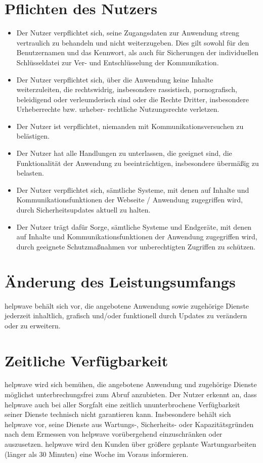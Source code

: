 \documentclass[10pt]{article}
\begin{document}
\section{Pflichten des Nutzers}
\begin{itemize}
	\item Der Nutzer verpflichtet sich, seine Zugangsdaten zur Anwendung streng vertraulich zu behandeln und nicht weiterzugeben.
	      Dies gilt sowohl für den Benutzernamen und das Kennwort, als auch für Sicherungen der individuellen Schlüsseldatei zur
	      Ver- und Entschlüsselung der Kommunikation.
	\item Der Nutzer verpflichtet sich, über die Anwendung keine Inhalte weiterzuleiten, die rechtswidrig, insbesondere rassistisch,
	      pornografisch, beleidigend oder verleumderisch sind oder die Rechte Dritter, insbesondere Urheberrechte bzw. urheber-
	      rechtliche Nutzungsrechte verletzen.
	\item Der Nutzer ist verpflichtet, niemanden mit Kommunikationsversuchen zu belästigen.
	\item Der Nutzer hat alle Handlungen zu unterlassen, die geeignet sind, die Funktionalität der Anwendung zu beeinträchtigen,
	      insbesondere übermäßig zu belasten.
	\item Der Nutzer verpflichtet sich, sämtliche Systeme, mit denen auf Inhalte und Kommunikationsfunktionen der Webseite /
	      Anwendung zugegriffen wird, durch Sicherheitsupdates aktuell zu halten.
	\item Der Nutzer trägt dafür Sorge, sämtliche Systeme und Endgeräte, mit denen auf Inhalte und Kommunikationsfunktionen der
	      Anwendung zugegriffen wird, durch geeignete Schutzmaßnahmen vor unberechtigten Zugriffen zu schützen.
\end{itemize}

\section{Änderung des Leistungsumfangs}
helpwave behält sich vor, die angebotene Anwendung sowie zugehörige Dienste jederzeit inhaltlich, grafisch und/oder funktionell durch Updates zu verändern oder zu erweitern.
\section{Zeitliche Verfügbarkeit}
helpwave wird sich bemühen, die angebotene Anwendung und zugehörige Dienste möglichst unterbrechungsfrei zum Abruf
anzubieten. Der Nutzer erkennt an, dass helpwave auch bei aller Sorgfalt eine zeitlich ununterbrochene Verfügbarkeit seiner
Dienste technisch nicht garantieren kann. Insbesondere behält sich helpwave vor, seine Dienste aus Wartungs-, Sicherheits-
oder Kapazitätsgründen nach dem Ermessen von helpwave vorübergehend einzuschränken oder auszusetzen. helpwave wird
den Kunden über größere geplante Wartungsarbeiten (länger als 30 Minuten) eine Woche im Voraus informieren.
\end{document}

